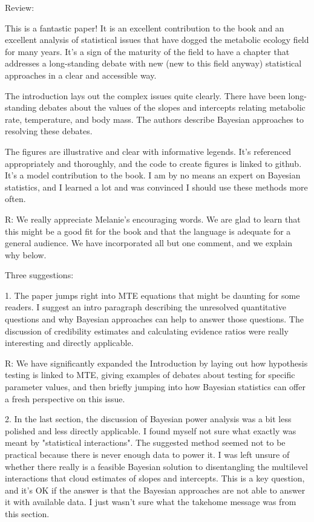 Review:

This is a fantastic paper! It is an excellent contribution to the book and an excellent analysis of statistical issues that have dogged the metabolic ecology field for many years. It's a sign of the maturity of the field to have a chapter that addresses a long-standing debate with new (new to this field anyway) statistical approaches in a clear and accessible way.

The introduction lays out the complex issues quite clearly. There have been long-standing debates about the values of the slopes and intercepts relating metabolic rate, temperature, and body mass. The authors describe Bayesian approaches to resolving these debates. 

The figures are illustrative and clear with informative legends. It's referenced appropriately and thoroughly, and the code to create figures is linked to github. It's a model contribution to the book. I am by no means an expert on Bayesian statistics, and I learned a lot and was convinced I should use these methods more often.

R: We really appreciate Melanie's encouraging words. We are glad to learn that this might be a good fit for the book and that the language is adequate for a general audience. We have incorporated all but one comment, and we explain why below.

Three suggestions:

1. The paper jumps right into MTE equations that might be daunting for some readers. I suggest an intro paragraph describing the unresolved quantitative questions and why Bayesian approaches can help to answer those questions. The discussion of credibility estimates and calculating evidence ratios were really interesting and directly applicable.

R: We have significantly expanded the Introduction by laying out how hypothesis testing is linked to MTE, giving examples of debates about testing for specific parameter values, and then briefly jumping into how Bayesian statistics can offer a fresh perspective on this issue.

2. In the last section, the discussion of Bayesian power analysis was a bit less polished and less directly applicable. I found myself not sure what exactly was meant by "statistical interactions". The suggested method seemed not to be practical because there is never enough data to power it. I was left unsure of whether there really is a feasible Bayesian solution to disentangling the multilevel interactions that cloud estimates of slopes and intercepts. This is a key question, and it's OK if the answer is that the Bayesian approaches are not able to answer it with available data. I just wasn't sure what the takehome message was from this section.

